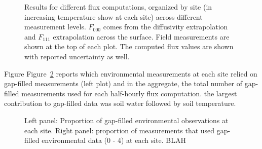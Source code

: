\documentclass[
  letterpaper,
  DIV=11,
  numbers=noendperiod]{scrartcl}
\begin{document}
\begin{figure}


\caption{\label{fig-flux-results}Results for different flux
computations, organized by site (in increasing temperature show at each
site) across different measurement levels. \(F_{000}\) comes from the
diffusivity extrapolation and \(F_{111}\) extrapolation across the
surface. Field measurements are shown at the top of each plot. The
computed flux values are shown with reported uncertainty as well.}

\end{figure}%

Figure Figure~\ref{fig-gap-filled-stats} reports which environmental
measurements at each site relied on gap-filled measurements (left plot)
and in the aggregate, the total number of gap-filled measurements used
for each half-hourly flux computation. the largest contribution to
gap-filled data was soil water followed by soil temperature.

\begin{figure}


\caption{\label{fig-gap-filled-stats}Left panel: Proportion of
gap-filled environmental observations at each site. Right panel:
proportion of measurements that used gap-filled environmental data (0 -
4) at each site. BLAH}

\end{figure}%
\end{document}
